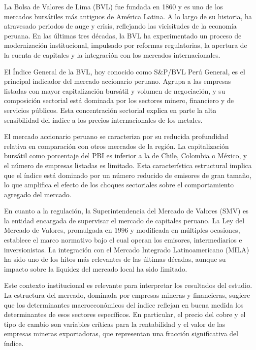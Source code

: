 \documentclass[12pt, a4paper]{article}
\begin{document}
La Bolsa de Valores de Lima (BVL) fue fundada en 1860 y es uno de los mercados bursátiles más antiguos de América Latina. A lo largo de su historia, ha atravesado periodos de auge y crisis, reflejando las vicisitudes de la economía peruana. En las últimas tres décadas, la BVL ha experimentado un proceso de modernización institucional, impulsado por reformas regulatorias, la apertura de la cuenta de capitales y la integración con los mercados internacionales.

El Índice General de la BVL, hoy conocido como S\&P/BVL Perú General, es el principal indicador del mercado accionario peruano. Agrupa a las empresas listadas con mayor capitalización bursátil y volumen de negociación, y su composición sectorial está dominada por los sectores minero, financiero y de servicios públicos. Esta concentración sectorial explica en parte la alta sensibilidad del índice a los precios internacionales de los metales.

El mercado accionario peruano se caracteriza por su reducida profundidad relativa en comparación con otros mercados de la región. La capitalización bursátil como porcentaje del PBI es inferior a la de Chile, Colombia o México, y el número de empresas listadas es limitado. Esta característica estructural implica que el índice está dominado por un número reducido de emisores de gran tamaño, lo que amplifica el efecto de los choques sectoriales sobre el comportamiento agregado del mercado.

En cuanto a la regulación, la Superintendencia del Mercado de Valores (SMV) es la entidad encargada de supervisar el mercado de capitales peruano. La Ley del Mercado de Valores, promulgada en 1996 y modificada en múltiples ocasiones, establece el marco normativo bajo el cual operan los emisores, intermediarios e inversionistas. La integración con el Mercado Integrado Latinoamericano (MILA) ha sido uno de los hitos más relevantes de las últimas décadas, aunque su impacto sobre la liquidez del mercado local ha sido limitado.

Este contexto institucional es relevante para interpretar los resultados del estudio. La estructura del mercado, dominada por empresas mineras y financieras, sugiere que los determinantes macroeconómicos del índice reflejan en buena medida los determinantes de esos sectores específicos. En particular, el precio del cobre y el tipo de cambio son variables críticas para la rentabilidad y el valor de las empresas mineras exportadoras, que representan una fracción significativa del índice.
\end{document}
